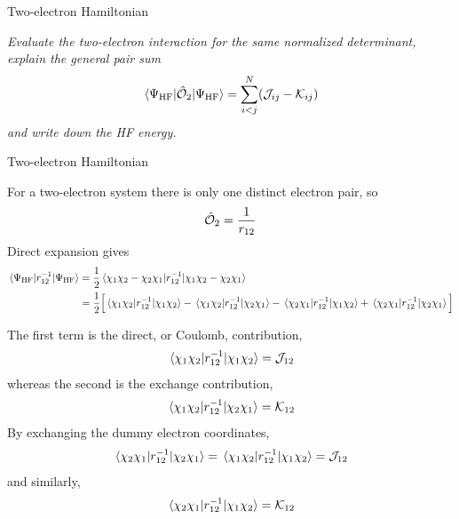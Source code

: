 \documentclass[11pt,a4paper,titlepage]{article}
\numberwithin{equation}{section}
\newcommand{\chO}{\Hat{\mathcal{O}}}
\newcommand{\cJ}{\mathcal{J}}
\newcommand{\cK}{\mathcal{K}}
\newcommand{\violet}[1]{\textcolor{hfViolet}{#1}}
\begin{document}
\begin{hfexercise}{Two-electron Hamiltonian}

\violet{\textit{Evaluate the two-electron interaction for the same
normalized determinant, explain the general pair sum}}
\begin{equation}
  \mel{\Psi_\text{HF}}{\chO_2}{\Psi_\text{HF}}
  =
  \sum_{i<j}^{N}
  (\cJ_{ij}-\cK_{ij})
\end{equation}
\violet{\textit{and write down the HF energy.}}

\end{hfexercise}
\begin{hfsolution}{Two-electron Hamiltonian}

For a two-electron system there is only one distinct electron pair, so
\begin{equation}
  \chO_2
  =
  \frac{1}{r_{12}}
\end{equation}
Direct expansion gives
\begin{equation}
\begin{split}
  \mel{\Psi_\text{HF}}{r_{12}^{-1}}{\Psi_\text{HF}}
  &=
  \frac{1}{2}
  \mel{\chi_1\chi_2-\chi_2\chi_1}
      {r_{12}^{-1}}
      {\chi_1\chi_2-\chi_2\chi_1}
  \\
  &=
  \frac{1}{2}
  \Big[
    \mel{\chi_1\chi_2}
        {r_{12}^{-1}}
        {\chi_1\chi_2}
    -
    \mel{\chi_1\chi_2}
        {r_{12}^{-1}}
        {\chi_2\chi_1}
    -
    \mel{\chi_2\chi_1}
        {r_{12}^{-1}}
        {\chi_1\chi_2}
    +
    \mel{\chi_2\chi_1}
        {r_{12}^{-1}}
        {\chi_2\chi_1}
  \Big]
  \label{eq:two-electron-two-body-expansion}
\end{split}
\end{equation}

The first term is the direct, or Coulomb, contribution,
\begin{equation}
  \mel{\chi_1\chi_2}
      {r_{12}^{-1}}
      {\chi_1\chi_2}
  =
  \cJ_{12}
\end{equation}
whereas the second is the exchange contribution,
\begin{equation}
  \mel{\chi_1\chi_2}
      {r_{12}^{-1}}
      {\chi_2\chi_1}
  =
  \cK_{12}
\end{equation}
By exchanging the dummy electron coordinates,
\begin{equation}
  \mel{\chi_2\chi_1}
      {r_{12}^{-1}}
      {\chi_2\chi_1}
  =
  \mel{\chi_1\chi_2}
      {r_{12}^{-1}}
      {\chi_1\chi_2}
  =
  \cJ_{12}
\end{equation}
and similarly,
\begin{equation}
  \mel{\chi_2\chi_1}
      {r_{12}^{-1}}
      {\chi_1\chi_2}
  =
  \cK_{12}
\end{equation}


\end{hfsolution}
\end{document}
